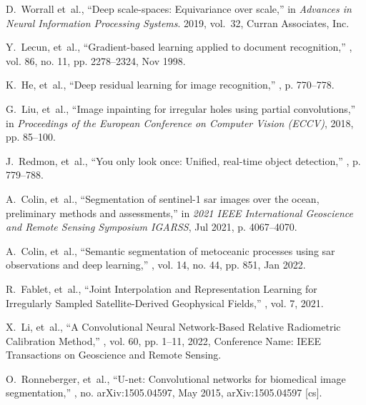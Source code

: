 \begin{bibunit}
\begin{thebibliography}{10}
D.~Worrall et~al.,
\newblock ``Deep scale-spaces: Equivariance over scale,''
\newblock in {\em Advances in Neural Information Processing Systems}. 2019,
  vol.~32, Curran Associates, Inc.

Y.~Lecun, et~al.,
\newblock ``Gradient-based learning applied to document recognition,''
, vol. 86, no. 11, pp. 2278–2324, Nov
  1998.

K.~He, et~al.,
\newblock ``Deep residual learning for image recognition,''
, p. 770–778.

G.~Liu, et~al.,
\newblock ``Image inpainting for irregular holes using partial convolutions,''
\newblock in {\em Proceedings of the {European} {Conference} on {Computer}
  {Vision} ({ECCV})}, 2018, pp. 85--100.

J.~Redmon, et~al.,
\newblock ``You only look once: Unified, real-time object detection,''
, p. 779–788.

A.~Colin, et~al.,
\newblock ``Segmentation of sentinel-1 sar images over the ocean, preliminary
  methods and assessments,''
\newblock in {\em 2021 IEEE International Geoscience and Remote Sensing
  Symposium IGARSS}, Jul 2021, p. 4067–4070.

A.~Colin, et~al.,
\newblock ``Semantic segmentation of metoceanic processes using sar
  observations and deep learning,''
, vol. 14, no. 44, pp. 851, Jan 2022.

R.~Fablet, et~al.,
\newblock ``Joint {Interpolation} and {Representation} {Learning} for
  {Irregularly} {Sampled} {Satellite}-{Derived} {Geophysical} {Fields},''
, vol. 7, 2021.

X.~Li, et~al.,
\newblock ``A {Convolutional} {Neural} {Network}-{Based} {Relative}
  {Radiometric} {Calibration} {Method},''
, vol. 60,
  pp. 1--11, 2022,
\newblock Conference Name: IEEE Transactions on Geoscience and Remote Sensing.

O.~Ronneberger, et~al.,
\newblock ``U-net: Convolutional networks for biomedical image segmentation,''
\newblock , no. arXiv:1505.04597, May 2015,
\newblock arXiv:1505.04597 [cs].


\end{thebibliography}
\end{bibunit}
